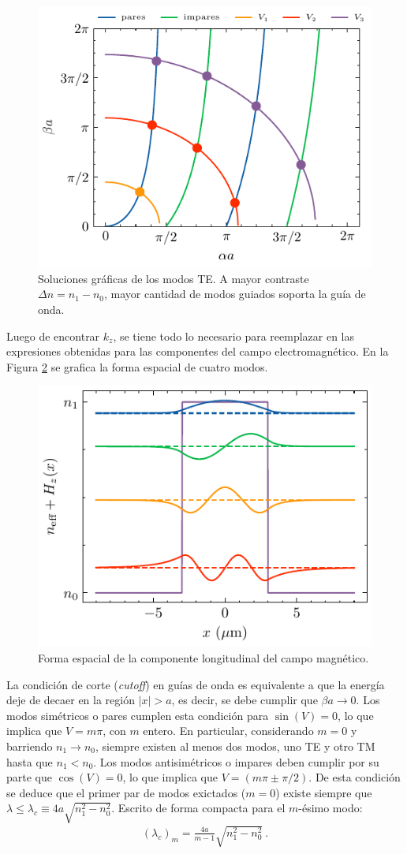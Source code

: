 \begin{figure}[H]
	\centering
	\includegraphics[width=0.7\linewidth]{media/slabgraphical.pdf}
	\caption[Soluciones gráficas de los modos TE.]{Soluciones gráficas de los modos TE. A mayor contraste $\Delta n = n_1-n_0$, mayor cantidad de modos guiados soporta la guía de onda. \label{fig:graphTE}}
\end{figure}
Luego de encontrar $k_z$, se tiene todo lo necesario para reemplazar en las expresiones obtenidas para las componentes del campo electromagnético. En la Figura \ref{fig:E-slab-graph} se grafica la forma espacial de cuatro modos.
\begin{figure}[H]
	\centering
	\includegraphics[width=0.7\linewidth]{media/TETMfields.pdf}
	\caption[Forma espacial de la componente longitudinal del campo magnético.]{ Forma espacial de la componente longitudinal del campo magnético. \label{fig:E-slab-graph}}
\end{figure}

La condición de corte (\textit{cutoff}) en guías de onda es equivalente a que la energía deje de decaer en la región $|x| > a$, es decir, se debe cumplir que $\beta a \to 0$. 
Los modos simétricos o pares cumplen esta condición para $\sin(V) = 0$, lo que implica que $V = m \pi$, con $m$ entero. En particular, considerando $m=0$  y barriendo $n_1 \to n_0$, siempre existen al menos dos modos, uno TE y otro TM hasta que $n_1 < n_0$.  
Los modos antisimétricos o impares deben cumplir por su parte que $\cos(V) = 0$, lo que implica que $V = (m\pi \pm \pi/2)$. De esta condición se deduce que el primer par de modos exictados ($m=0$) existe siempre que $\lambda \le \lambda_c \equiv 4a\sqrt{n_1^2-n_0^2}$. Escrito de forma compacta para el $m$-ésimo modo:
\begin{align*}
	 (\lambda_c)_m = \frac{4a}{m-1}  \sqrt{n_1^2-n_0^2} \ .
\end{align*}
